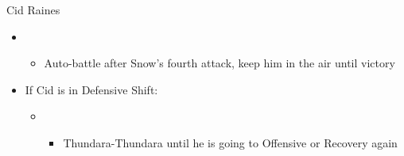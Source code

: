 \begin{battle}[1:43]{Cid Raines}
\begin{itemize}
			\item \sixth
			      \begin{itemize}
				      \item Auto-battle after Snow's fourth attack, keep him in the air until victory
			      \end{itemize}
			\item If Cid is in Defensive Shift:
			      \begin{itemize}
				      \item \second
				            \begin{itemize}
					            \item Thundara-Thundara until he is going to Offensive or Recovery again
				            \end{itemize}
			      \end{itemize}
			     \end{itemize}
	\end{battle}
